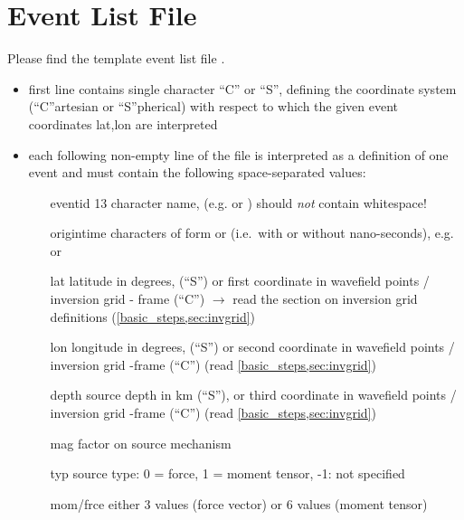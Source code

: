 %
\section{Event List File} \label{files,sec:event_list}
%
Please find the template event list file .

\begin{itemize}
\item first line contains single character ``C'' or ``S'', defining the coordinate system (``C''artesian or ``S''pherical)
  with respect to which the given event coordinates lat,lon are interpreted
\item each following non-empty line of the file is interpreted as a definition of one event and must 
  contain the following space-separated values:
  \begin{itemize}
  \item[eventid]  13 character name, (e.g.  or ) 
    should \emph{not} contain whitespace!
  \item[origintime]  characters of form  or 
    (i.e.\ with or without nano-seconds), e.g.  or 
  \item[lat] latitude in degrees,  (``S'') or first coordinate in 
    wavefield points / inversion grid - frame (``C'') $\rightarrow$  read the section on inversion grid definitions 
    (\ref{basic_steps,sec:invgrid})
  \item[lon] longitude in degrees,  (``S'') or second  coordinate in 
    wavefield points / inversion grid -frame (``C'') (read \ref{basic_steps,sec:invgrid})
  \item[depth] source depth in km (``S''), or third coordinate in wavefield points / inversion grid -frame (``C'') 
    (read \ref{basic_steps,sec:invgrid})
  \item[mag] factor on source mechanism
  \item[typ] source type:  0 = force, 1 = moment tensor, -1: not specified
  \item[mom/frce] either 3 values (force vector) or 6 values (moment tensor)
  \end{itemize}
\end{itemize}
%
